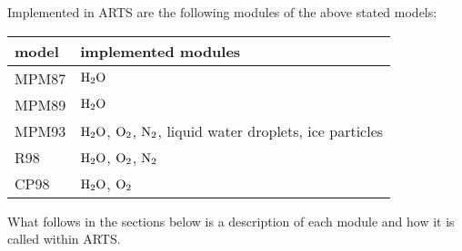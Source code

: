 {Implemented in ARTS are the following modules of the above stated models:
%
\begin{center}
\begin{tabular}{ll}
\hline
model & implemented modules \\
\hline
MPM87 & $\mbox{H}_2\mbox{O}$ \\
MPM89 & $\mbox{H}_2\mbox{O}$ \\
MPM93 & $\mbox{H}_2\mbox{O}$, $\mbox{O}_2$, $\mbox{N}_2$, liquid water droplets, ice particles \\
R98   & $\mbox{H}_2\mbox{O}$, $\mbox{O}_2$, $\mbox{N}_2$ \\
CP98  & $\mbox{H}_2\mbox{O}$, $\mbox{O}_2$ \\
\hline
\end{tabular}
\end{center}
%
What follows in the sections below is a description of each module and how it is 
called within ARTS.

}
